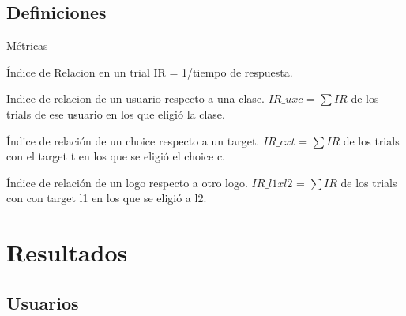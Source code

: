 \documentclass{beamer}
\begin{document}
\subsection{Definiciones}

\begin{frame}{Métricas}
\begin{block}{Índice de Relacion en un trial}
IR = 1/tiempo de respuesta. 
\end{block}

\begin{block}{Indice de relacion de un usuario respecto a una clase.}
$IR\_uxc$ = $\sum IR$ de los trials de ese usuario en los que eligió la clase.
\end{block}

\begin{block}{Índice de relación de un choice respecto a un target.}
$IR\_cxt$ = $\sum IR$ de los trials con el target t en los que se eligió el choice c.
\end{block}

\begin{block}{Índice de relación de un logo respecto a otro logo.}
$IR\_l1xl2$ = $\sum IR$ de los trials con con target l1 en los que se eligió a l2.
\end{block}

\end{frame}

\section{Resultados}

\subsection{Usuarios}
\end{document}
